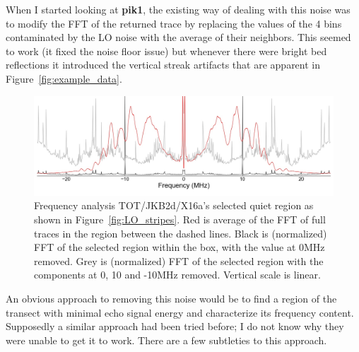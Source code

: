 \documentclass[11pt]{article}
\newcommand{\todo}[1]{\ifthenelse{\boolean{include-todos}} {\textcolor{Red}{\textbf{TODO: #1}}}{}}
\newcommand{\figref}[1]{Figure~\ref{#1}}
\begin{document}
When I started looking at \textbf{pik1}, the existing way of dealing with this noise was to modify the FFT of the returned trace by replacing the values of the 4 bins contaminated by the LO noise with the average of their neighbors. This seemed to work (it fixed the noise floor issue) but whenever there were bright bed reflections it introduced the vertical streak artifacts that are apparent in \figref{fig:example_data}.


\begin{figure}[ht!]
\centering
\includegraphics[width=1.0\columnwidth]{figures/LO_fft.jpg}
\caption[]{Frequency analysis TOT/JKB2d/X16a's selected quiet region as shown in \figref{fig:LO_stripes}. Red is average of the FFT of full traces in the region between the dashed lines. Black is (normalized) FFT of the selected region within the box, with the value at 0MHz removed. Grey is (normalized) FFT of the selected region with the components at 0, 10 and -10MHz removed. Vertical scale is linear.}
\label{fig:LO_fft}
\end{figure}

An obvious approach to removing this noise would be to find a region of the transect with minimal echo signal energy and characterize its frequency content. Supposedly a similar approach had been tried before; I do not know why they were unable to get it to work.
There are a few subtleties to this approach.
\end{document}
